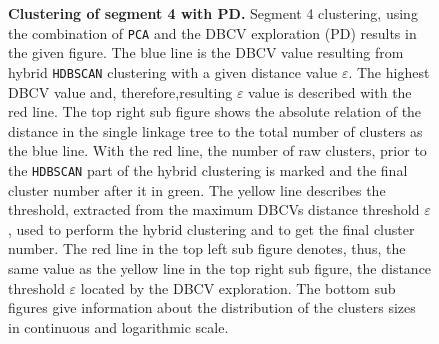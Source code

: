 \begin{figure}[!htb]
\begin{subfigure}[b]{0.475\textwidth}
    \end{subfigure}
    \caption[Clustering of segment 4 with PD]{\textbf{Clustering of segment 4 with PD.} Segment 4 clustering, using the combination of \texttt{PCA} and the \gls{DBCV} exploration (PD) results in the given figure. The blue line is the \gls{DBCV} value resulting from hybrid \texttt{HDBSCAN} clustering with a given distance value $\varepsilon$. The highest \gls{DBCV} value and, therefore,resulting $\varepsilon$ value is described with the red line. The top right sub figure shows the absolute relation of the distance in the single linkage tree to the total number of clusters as the blue line. With the red line, the number of raw clusters, prior to the \texttt{HDBSCAN} part of the hybrid clustering is marked and the final cluster number after it in green. The yellow line describes the threshold, extracted from the maximum \glspl{DBCV} distance threshold $\varepsilon$, used to perform the hybrid clustering and to get the final cluster number. The red line in the top left sub figure denotes, thus, the same value as the yellow line in the top right sub figure, the distance threshold $\varepsilon$ located by the \gls{DBCV} exploration. The bottom sub figures give information about the distribution of the clusters sizes in continuous and logarithmic scale.}
    \label{fig:PCA_Cluster_DBCV_4}
\end{figure}

\FloatBarrier
\newpage

